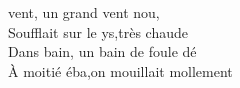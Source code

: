  vent, un grand vent nou, \\
Soufflait sur le ys,très chaude \\
Dans  bain, un bain de foule dé \\
À moitié éba,on  mouillait mollement \\

